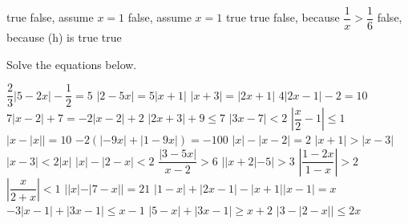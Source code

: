 	\begin{Answer}\phantom{}
    	\begin{multicols}{2}
    		
    			\Question true
    			\Question false, assume $x=1$
    			\Question false, assume $x=1$
    			\Question true
    			\Question true
    			\Question false, because $\dfrac{1}{x} > \dfrac{1}{6}$
    			\Question false, because (h) is true
    			\Question true
    		\EndCurrentQuestion
    	\end{multicols}
\end{Answer}
\fi


\begin{Exercise} Solve the equations below.  
	\begin{multicols}{2}
	    \Question[difficulty = 1] $\dfrac{2}{3}|5-2x|-\dfrac{1}{2} = 5$ 
		\Question[difficulty = 1] $|2-5x| = 5|x+1|$ 
		\Question[difficulty = 1] $|x+3| = |2x+1|$ 
		\Question[difficulty = 1] $4|2x-1| -2 = 10$ 
		\Question[difficulty = 1] $7|x-2| +7 = -2|x-2|+2$ 
		\Question[difficulty = 1] $|2x+3|+9 \leq 7$ 
		\Question[difficulty = 1] $|3x-7|<2$ 
		\Question[difficulty = 1] $\left|\dfrac{x}{2}-1\right| \leq 1$ 
		\ifanalysis\Question[difficulty = 1]\fi \ifcalculus\Question[difficulty = 2]\fi $|x-|x||=10$ %
		\ifanalysis\Question[difficulty = 1]\fi \ifcalculus\Question[difficulty = 2]\fi $-2 \left( |-9x| + |1-9x| \right)=-100$ 
		\ifanalysis\Question[difficulty = 1]\fi \ifcalculus\Question[difficulty = 2]\fi $|x|-|x-2|=2$ 
		\ifanalysis\Question[difficulty = 1]\fi \ifcalculus\Question[difficulty = 2]\fi $|x+1|> |x-3|$ 
		\ifanalysis\Question[difficulty = 1]\fi \ifcalculus\Question[difficulty = 2]\fi $|x-3| < 2|x|$ 
		\ifanalysis\Question[difficulty = 1]\fi \ifcalculus\Question[difficulty = 2]\fi $|x|-|2-x|<2$ 
		\Question[difficulty = 2] $\dfrac{|3-5x|}{x-2} > 6$ 
		\Question[difficulty = 2] $||x+2|-5| > 3$ 
		\Question[difficulty = 2] $\left| \dfrac{1-2x}{1-x} \right| > 2$ 
	    \Question[difficulty = 2] $\left|\dfrac{x}{2+x}\right| < 1 $ 
	    \Question[difficulty = 2] $||x|-|7-x||=21$ 
	    \Question[difficulty = 2] $|1-x| + |2x-1| - |x+1| |x-1| = x$ 
	    \Question[difficulty = 2] $-3|x-1|+|3x-1| \leq x-1$ 
	    \ifanalysis\Question[difficulty = 2]\fi \ifcalculus\Question[difficulty = 3]\fi $|5-x|+|3x-1| \geq x+2$ 
	    \ifanalysis\Question[difficulty = 2]\fi \ifcalculus\Question[difficulty = 3]\fi $|3-|2-x|| \leq 2x$ 
        \EndCurrentQuestion
	\end{multicols}
\end{Exercise}
	
